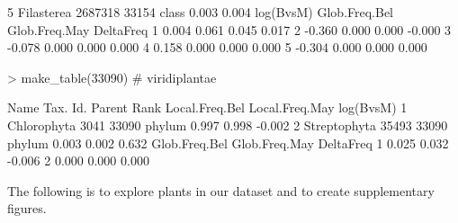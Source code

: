 \documentclass{article}
\begin{document}
\begin{Schunk}
\begin{Soutput}
5       Filasterea  2687318  33154   class          0.003          0.004
  log(BvsM) Glob.Freq.Bel Glob.Freq.May DeltaFreq
1     0.004         0.061         0.045     0.017
2    -0.360         0.000         0.000    -0.000
3    -0.078         0.000         0.000     0.000
4     0.158         0.000         0.000     0.000
5    -0.304         0.000         0.000     0.000
\end{Soutput}
\begin{Sinput}
> make_table(33090) # viridiplantae
\end{Sinput}
\begin{Soutput}
          Name Tax. Id. Parent   Rank Local.Freq.Bel Local.Freq.May log(BvsM)
1  Chlorophyta     3041  33090 phylum          0.997          0.998    -0.002
2 Streptophyta    35493  33090 phylum          0.003          0.002     0.632
  Glob.Freq.Bel Glob.Freq.May DeltaFreq
1         0.025         0.032    -0.006
2         0.000         0.000     0.000
\end{Soutput}
\end{Schunk}

The following is to explore plants in our dataset and to create supplementary figures.
\end{document}
